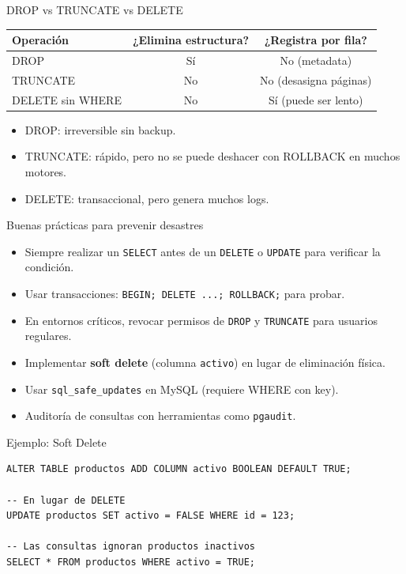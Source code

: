 \documentclass[aspectratio=169, 10pt, xcolor=table]{beamer}
\begin{document}
\begin{frame}{DROP vs TRUNCATE vs DELETE}
    \begin{table}
        \centering
        \begin{tabular}{l|c|c}
            \toprule
            Operación & ¿Elimina estructura? & ¿Registra por fila? \\
            \midrule
            DROP & Sí & No (metadata) \\
            TRUNCATE & No & No (desasigna páginas) \\
            DELETE sin WHERE & No & Sí (puede ser lento) \\
            \bottomrule
        \end{tabular}
    \end{table}
    \begin{itemize}
        \item DROP: irreversible sin backup.
        \item TRUNCATE: rápido, pero no se puede deshacer con ROLLBACK en muchos motores.
        \item DELETE: transaccional, pero genera muchos logs.
    \end{itemize}
\end{frame}

\begin{frame}{Buenas prácticas para prevenir desastres}
    \begin{itemize}
        \item Siempre realizar un \texttt{SELECT} antes de un \texttt{DELETE} o \texttt{UPDATE} para verificar la condición.
        \item Usar transacciones: \texttt{BEGIN; DELETE ...; ROLLBACK;} para probar.
        \item En entornos críticos, revocar permisos de \texttt{DROP} y \texttt{TRUNCATE} para usuarios regulares.
        \item Implementar \textbf{soft delete} (columna \texttt{activo}) en lugar de eliminación física.
        \item Usar \texttt{sql\_safe\_updates} en MySQL (requiere WHERE con key).
        \item Auditoría de consultas con herramientas como \texttt{pgaudit}.
    \end{itemize}
\end{frame}

\begin{frame}[fragile]{Ejemplo: Soft Delete}
    \begin{lstlisting}[style=sqlstyle]
ALTER TABLE productos ADD COLUMN activo BOOLEAN DEFAULT TRUE;

-- En lugar de DELETE
UPDATE productos SET activo = FALSE WHERE id = 123;

-- Las consultas ignoran productos inactivos
SELECT * FROM productos WHERE activo = TRUE;
    \end{lstlisting}
\end{frame}
\end{document}
